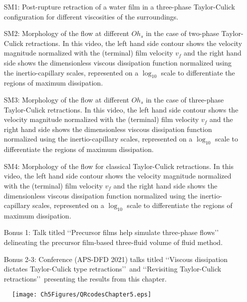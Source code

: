 \begin{subappendices}
	\begin{enumerate}
		\item[SM1:] Post-rupture retraction of a water film in a three-phase Taylor-Culick configuration for different viscosities of the surroundings.
		\item[SM2:] Morphology of the flow at different $Oh_{s}$ in the case of two-phase Taylor-Culick retractions. In this video, the left hand side contour shows the velocity magnitude normalized with the (terminal) film velocity $v_f$ and the right hand side shows the dimensionless viscous dissipation function normalized using the inertio-capillary scales, represented on a $\log_{\text{10}}$ scale to differentiate the regions of maximum dissipation. 
		\item[SM3:] Morphology of the flow at different $Oh_{s}$ in the case of three-phase Taylor-Culick retractions. In this video, the left hand side contour shows the velocity magnitude normalized with the (terminal) film velocity $v_f$ and the right hand side shows the dimensionless viscous dissipation function normalized using the inertio-capillary scales, represented on a $\log_{\text{10}}$ scale to differentiate the regions of maximum dissipation. 
		\item[SM4:] Morphology of the flow for classical Taylor-Culick retractions. In this video, the left hand side contour shows the velocity magnitude normalized with the (terminal) film velocity $v_f$ and the right hand side shows the dimensionless viscous dissipation function normalized using the inertio-capillary scales, represented on a $\log_{\text{10}}$ scale to differentiate the regions of maximum dissipation. 
		\item[Bonus 1:] Talk titled \lq\lq Precursor films help simulate three-phase flows\rq\rq\, delineating the precursor film-based three-fluid volume of fluid method.
		\item[Bonus 2-3:] Conference (APS-DFD 2021) talks titled \lq\lq Viscous dissipation dictates Taylor-Culick type retractions\rq\rq\, and \lq\lq Revisiting Taylor-Culick retractions\rq\rq\, presenting the results from this chapter. 
	\end{enumerate}

\begin{figure*}
	\centering
	\texttt{[image: Ch5Figures/QRcodesChapter5.eps]}
\end{figure*}

\end{subappendices}
